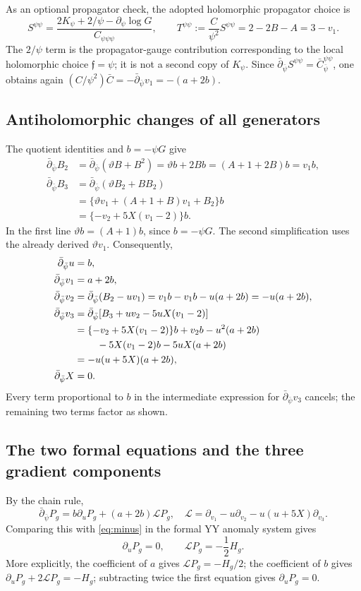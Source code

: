 \documentclass[11pt,a4paper]{article}
\numberwithin{equation}{section}
\newcommand{\bdel}{\bar\partial_{\bar\psi}}
\newcommand{\tht}{\vartheta}
\newcommand{\del}{\partial}
\begin{document}
As an optional propagator check, the adopted holomorphic propagator choice is
\begin{equation}
S^{\psi\psi}=\frac{2K_\psi+2/\psi-\del_\psi\log G}{C_{\psi\psi\psi}},
\qquad
T^{\psi\psi}:=\frac C{\psi^2}S^{\psi\psi}=2-2B-A=3-v_1.
\end{equation}
The $2/\psi$ term is the propagator-gauge contribution corresponding to
the local holomorphic choice $\mathfrak f=\psi$; it is not a second
copy of $K_\psi$. Since $\bdel S^{\psi\psi}=\bar C_{\bar\psi}^{\psi\psi}$,
one obtains again $(C/\psi^2)\bar C=-\bdel v_1=-(a+2b)$.

\subsection{Antiholomorphic changes of all generators}
The quotient identities and $b=-\psi G$ give
\begin{align}
\bdel B_2&=\bdel(\tht B+B^2)
          =\tht b+2Bb=(A+1+2B)b=v_1b,\\
\bdel B_3&=\bdel(\tht B_2+BB_2)\\
 &=\{\tht v_1+(A+1+B)v_1+B_2\}b\\
 &=\{-v_2+5X(v_1-2)\}b.
\end{align}
In the first line $\tht b=(A+1)b$, since $b=-\psi G$.
The second simplification uses the already derived $\tht v_1$.
Consequently,
\begin{align}
\bdel u&=b,\\
\bdel v_1&=a+2b,\\
\bdel v_2&=\bdel(B_2-uv_1)
           =v_1b-v_1b-u(a+2b)=-u(a+2b),\\
\bdel v_3&=\bdel[B_3+uv_2-5uX(v_1-2)]\\
 &=\{-v_2+5X(v_1-2)\}b+v_2b-u^2(a+2b)\\
 &\hspace{8mm}-5X(v_1-2)b-5uX(a+2b)\\
 &=-u(u+5X)(a+2b),\\
\bdel X&=0.
\end{align}
Every term proportional to $b$ in the intermediate expression for
$\bdel v_3$ cancels; the remaining two terms factor as shown.

\subsection{The two formal equations and the three gradient components}
By the chain rule,
\begin{equation}
\bdel P_g=b\del_uP_g+(a+2b)\mathscr L P_g,
\quad
\mathscr L=\del_{v_1}-u\del_{v_2}-u(u+5X)\del_{v_3}.
\end{equation}
Comparing this with \eqref{eq:minus} in the formal YY anomaly system gives
\begin{equation}\boxed{\del_uP_g=0,\qquad \mathscr L P_g=-\frac12 H_g.}\label{eq:PDE}
\end{equation}
More explicitly, the coefficient of $a$ gives $\mathscr L P_g=-H_g/2$;
the coefficient of $b$ gives $\del_uP_g+2\mathscr L P_g=-H_g$;
subtracting twice the first equation gives $\del_uP_g=0$.
\end{document}
